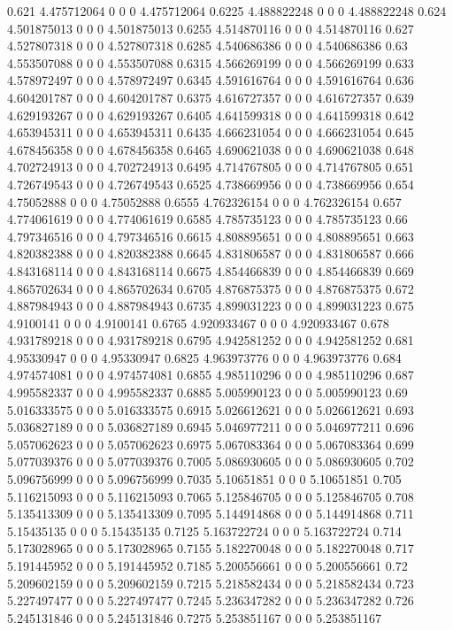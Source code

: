 {0.621 4.475712064 0 0 0 4.475712064
0.6225 4.488822248 0 0 0 4.488822248
0.624 4.501875013 0 0 0 4.501875013
0.6255 4.514870116 0 0 0 4.514870116
0.627 4.527807318 0 0 0 4.527807318
0.6285 4.540686386 0 0 0 4.540686386
0.63 4.553507088 0 0 0 4.553507088
0.6315 4.566269199 0 0 0 4.566269199
0.633 4.578972497 0 0 0 4.578972497
0.6345 4.591616764 0 0 0 4.591616764
0.636 4.604201787 0 0 0 4.604201787
0.6375 4.616727357 0 0 0 4.616727357
0.639 4.629193267 0 0 0 4.629193267
0.6405 4.641599318 0 0 0 4.641599318
0.642 4.653945311 0 0 0 4.653945311
0.6435 4.666231054 0 0 0 4.666231054
0.645 4.678456358 0 0 0 4.678456358
0.6465 4.690621038 0 0 0 4.690621038
0.648 4.702724913 0 0 0 4.702724913
0.6495 4.714767805 0 0 0 4.714767805
0.651 4.726749543 0 0 0 4.726749543
0.6525 4.738669956 0 0 0 4.738669956
0.654 4.75052888 0 0 0 4.75052888
0.6555 4.762326154 0 0 0 4.762326154
0.657 4.774061619 0 0 0 4.774061619
0.6585 4.785735123 0 0 0 4.785735123
0.66 4.797346516 0 0 0 4.797346516
0.6615 4.808895651 0 0 0 4.808895651
0.663 4.820382388 0 0 0 4.820382388
0.6645 4.831806587 0 0 0 4.831806587
0.666 4.843168114 0 0 0 4.843168114
0.6675 4.854466839 0 0 0 4.854466839
0.669 4.865702634 0 0 0 4.865702634
0.6705 4.876875375 0 0 0 4.876875375
0.672 4.887984943 0 0 0 4.887984943
0.6735 4.899031223 0 0 0 4.899031223
0.675 4.9100141 0 0 0 4.9100141
0.6765 4.920933467 0 0 0 4.920933467
0.678 4.931789218 0 0 0 4.931789218
0.6795 4.942581252 0 0 0 4.942581252
0.681 4.95330947 0 0 0 4.95330947
0.6825 4.963973776 0 0 0 4.963973776
0.684 4.974574081 0 0 0 4.974574081
0.6855 4.985110296 0 0 0 4.985110296
0.687 4.995582337 0 0 0 4.995582337
0.6885 5.005990123 0 0 0 5.005990123
0.69 5.016333575 0 0 0 5.016333575
0.6915 5.026612621 0 0 0 5.026612621
0.693 5.036827189 0 0 0 5.036827189
0.6945 5.046977211 0 0 0 5.046977211
0.696 5.057062623 0 0 0 5.057062623
0.6975 5.067083364 0 0 0 5.067083364
0.699 5.077039376 0 0 0 5.077039376
0.7005 5.086930605 0 0 0 5.086930605
0.702 5.096756999 0 0 0 5.096756999
0.7035 5.10651851 0 0 0 5.10651851
0.705 5.116215093 0 0 0 5.116215093
0.7065 5.125846705 0 0 0 5.125846705
0.708 5.135413309 0 0 0 5.135413309
0.7095 5.144914868 0 0 0 5.144914868
0.711 5.15435135 0 0 0 5.15435135
0.7125 5.163722724 0 0 0 5.163722724
0.714 5.173028965 0 0 0 5.173028965
0.7155 5.182270048 0 0 0 5.182270048
0.717 5.191445952 0 0 0 5.191445952
0.7185 5.200556661 0 0 0 5.200556661
0.72 5.209602159 0 0 0 5.209602159
0.7215 5.218582434 0 0 0 5.218582434
0.723 5.227497477 0 0 0 5.227497477
0.7245 5.236347282 0 0 0 5.236347282
0.726 5.245131846 0 0 0 5.245131846
0.7275 5.253851167 0 0 0 5.253851167
}
